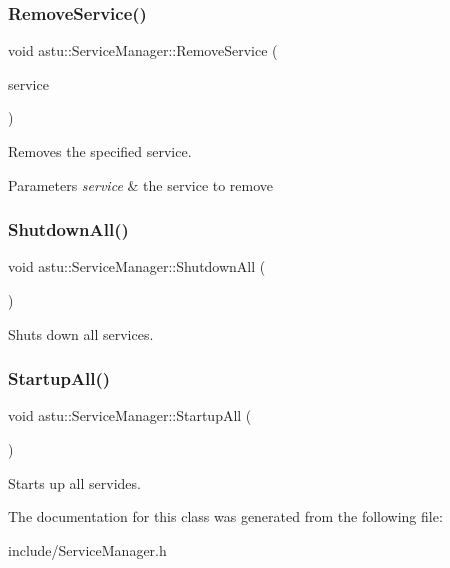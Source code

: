 \subsubsection{\texorpdfstring{Remove\+Service()}{RemoveService()}}
{\footnotesize\ttfamily void astu\+::\+Service\+Manager\+::\+Remove\+Service (\begin{DoxyParamCaption}\item[{std\+::shared\+\_\+ptr$<$ \hyperlink{classastu_1_1IService}{I\+Service} $>$}]{service }\end{DoxyParamCaption})}

Removes the specified service.


\begin{DoxyParams}{Parameters}
{\em service} & the service to remove \\
\hline
\end{DoxyParams}
\mbox{\label{classastu_1_1ServiceManager_a0ec3c06392ae4e7dab8d4b550bed1699}} 
\subsubsection{\texorpdfstring{Shutdown\+All()}{ShutdownAll()}}
{\footnotesize\ttfamily void astu\+::\+Service\+Manager\+::\+Shutdown\+All (\begin{DoxyParamCaption}{ }\end{DoxyParamCaption})}

Shuts down all services. \mbox{\label{classastu_1_1ServiceManager_a7d4918c435a26a4212902ade5f9829b6}} 
\subsubsection{\texorpdfstring{Startup\+All()}{StartupAll()}}
{\footnotesize\ttfamily void astu\+::\+Service\+Manager\+::\+Startup\+All (\begin{DoxyParamCaption}{ }\end{DoxyParamCaption})}

Starts up all servides. 

The documentation for this class was generated from the following file\+:\begin{DoxyCompactItemize}
\item 
include/Service\+Manager.\+h\end{DoxyCompactItemize}
